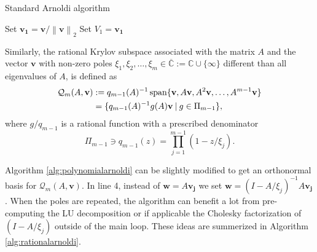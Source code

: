 \begin{algorithm}[ht!]
    \caption{Standard Arnoldi algorithm}
    \label{alg:polynomialarnoldi}
    Set $\mathbf{v_1} = \mathbf{v} / \left\| \mathbf{v} \right\|_2$\;
    Set $V_1 = \mathbf{v_1}$\;
\end{algorithm}

Similarly, the rational Krylov subspace \cite{guttel2013rational} associated with
the matrix $A$ and the vector $\mathbf{v}$ with non-zero poles
$\xi_1, \xi_2, \dots, \xi_m \in \overline{\mathbb{C}} := \mathbb{C} \cup \{ \infty\}$
different than all eigenvalues of $A$, is defined as
\begin{equation}
    \label{eq:rationalkrylovsubspacedefinition}
    \begin{aligned}
        \mathcal{Q}_m(A, \mathbf{v})
        & := q_{m-1}(A)^{-1} \operatorname{span}\{\mathbf{v}, A\mathbf{v}, A^{2}\mathbf{v}, \dots, A^{m-1}\mathbf{v} \}\\
         & = \{q_{m-1}(A)^{-1} g(A)\mathbf{v} \:|\: g \in \Pi_{m-1} \},
    \end{aligned}
\end{equation}
where $g / q_{m-1}$ is a rational function with a prescribed denominator
\begin{equation*}
    \Pi_{m-1} \ni q_{m-1}(z) = \prod_{j=1}^{m-1}(1 - z / \xi_j).
\end{equation*}

Algorithm \ref{alg:polynomialarnoldi} can be slightly modified to get an orthonormal
basis for $\mathcal{Q}_m(A, \mathbf{v})$. In line 4, instead of $\mathbf{w} = A \mathbf{v_j}$ we set
$\mathbf{w} = (I - A / \xi_j)^{-1} A \mathbf{v_j}$. When the poles are repeated, the algorithm can benefit
a lot from pre-computing the LU decomposition or if applicable the Cholesky factorization
of $(I - A / \xi_j)$ outside of the main loop. These ideas are summerized in Algorithm
\ref{alg:rationalarnoldi}.

